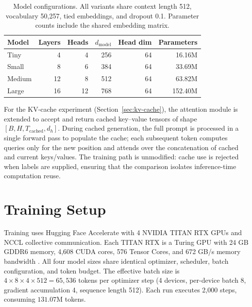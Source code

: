 \documentclass{article}
\begin{document}
\begin{table}[!tbp]
\centering
\caption{Model configurations. All variants share context length 512, vocabulary 50{,}257, tied embeddings, and dropout 0.1. Parameter counts include the shared embedding matrix.}
\label{tab:architecture}
\begin{tabular}{lrrrrr}
\toprule
Model & Layers & Heads & $d_{\mathrm{model}}$ & Head dim & Parameters \\
\midrule
Tiny & 4 & 4 & 256 & 64 & 16.16M \\
Small & 8 & 6 & 384 & 64 & 33.69M \\
Medium & 12 & 8 & 512 & 64 & 63.82M \\
Large & 16 & 12 & 768 & 64 & 152.40M \\
\bottomrule
\end{tabular}
\end{table}

For the KV-cache experiment (Section~\ref{sec:kv-cache}), the attention module is extended to accept and return cached key--value tensors of shape $[B, H, T_{\mathrm{cached}}, d_h]$. During cached generation, the full prompt is processed in a single forward pass to populate the cache; each subsequent token computes queries only for the new position and attends over the concatenation of cached and current keys/values. The training path is unmodified: cache use is rejected when labels are supplied, ensuring that the comparison isolates inference-time computation reuse.

\clearpage
\section{Training Setup}

Training uses Hugging Face Accelerate with 4 NVIDIA TITAN RTX GPUs and NCCL collective communication. Each TITAN RTX is a Turing GPU with 24 GB GDDR6 memory, 4{,}608 CUDA cores, 576 Tensor Cores, and 672 GB/s memory bandwidth \cite{nvidiatitanrtx}. All four model sizes share identical optimizer, scheduler, batch configuration, and token budget. The effective batch size is $4 \times 8 \times 4 \times 512 = 65{,}536$ tokens per optimizer step (4 devices, per-device batch 8, gradient accumulation 4, sequence length 512). Each run executes 2{,}000 steps, consuming $131.07\text{M}$ tokens.
\end{document}
